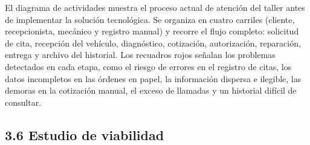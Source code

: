 El diagrama de actividades muestra el proceso actual de atención del
taller antes de implementar la solución tecnológica. Se organiza en
cuatro carriles (cliente, recepcionista, mecánico y registro manual) y
recorre el flujo completo: solicitud de cita, recepción del vehículo,
diagnóstico, cotización, autorización, reparación, entrega y archivo del
historial. Los recuadros rojos señalan los problemas detectados en cada
etapa, como el riesgo de errores en el registro de citas, los datos
incompletos en las órdenes en papel, la información dispersa e ilegible,
las demoras en la cotización manual, el exceso de llamadas y un
historial difícil de consultar.

\subsection{3.6 Estudio de viabilidad}\label{estudio-de-viabilidad}

